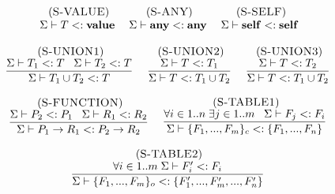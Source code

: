 \begin{figure}[!ht]
\begin{footnotesize}
$$\begin{array}{c}
\;
\begin{array}{c}
\mylabel{S-VALUE}\\
\senv \vdash T \subtype \Value
\end{array}
\;
\begin{array}{c}
\mylabel{S-ANY}\\
\senv \vdash \Any \subtype \Any
\end{array}
\;
\begin{array}{c}
\mylabel{S-SELF}\\
\senv \vdash \Self \subtype \Self
\end{array}
\\ \\
\begin{array}{c}
\mylabel{S-UNION1}\\
\dfrac{\senv \vdash T_{1} \subtype T \;\;\;
       \senv \vdash T_{2} \subtype T}
      {\senv \vdash T_{1} \cup T_{2} \subtype T}
\end{array}
\;
\begin{array}{c}
\mylabel{S-UNION2}\\
\dfrac{\senv \vdash T \subtype T_{1}}
      {\senv \vdash T \subtype T_{1} \cup T_{2}}
\end{array}
\;
\begin{array}{c}
\mylabel{S-UNION3}\\
\dfrac{\senv \vdash T \subtype T_{2}}
      {\senv \vdash T \subtype T_{1} \cup T_{2}}
\end{array}
\\ \\
\begin{array}{c}
\mylabel{S-FUNCTION}\\
\dfrac{\senv \vdash P_{2} \subtype P_{1} \;\;\;
       \senv \vdash R_{1} \subtype R_{2}}
      {\senv \vdash P_{1} \rightarrow R_{1} \subtype P_{2} \rightarrow R_{2}}
\end{array}
\;
\begin{array}{c}
\mylabel{S-TABLE1}\\
\dfrac{\forall i \in 1..n \; \exists j \in 1..m \;\;\;
       \senv \vdash F_{j} \subtype F_{i}}
      {\senv \vdash \{F_{1}, ..., F_{m}\}_{c} \subtype \{F_{1}, ..., F_{n}\}}
\end{array}
\\ \\
\begin{array}{c}
\mylabel{S-TABLE2}\\
\dfrac{\forall i \in 1..m \; \senv \vdash F_{i}' \subtype F_{i}}
      {\senv \vdash \{F_{1}, ..., F_{m}\}_{o} \subtype \{F_{1}', ..., F_{m}', ..., F_{n}'\}}

\end{array}
\end{array}$$
\end{footnotesize}
\end{figure}
